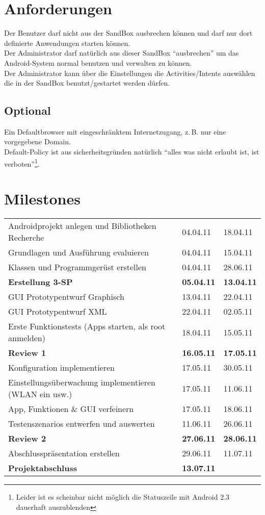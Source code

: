 \documentclass[12pt,a4paper,ngerman]{scrartcl}
\newcommand{\zB}{\mbox{z.\,B.}\xspace}
\begin{document}
\section*{Anforderungen}
Der Benutzer darf nicht aus der SandBox ausbrechen können und darf nur dort definierte Anwendungen starten können. \\
Der Administrator darf natürlich aus dieser SandBox \enquote{ausbrechen} um das Android-System normal benutzen und verwalten zu können. \\
Der Administrator kann über die Einstellungen die Activities/Intents auswählen die in der SandBox benutzt/gestartet werden dürfen.
\subsection*{Optional}
Ein Defaultbrowser mit eingeschränktem Internetzugang, \zB nur eine vorgegebene Domain. \\
Default-Policy ist aus sicherheitsgründen natürlich \enquote{alles was nicht erlaubt ist, ist verboten}\footnote{Leider ist es scheinbar nicht möglich die Statuszeile mit Android 2.3 dauerhaft auszublenden}.

\section*{Milestones}
\begin{tabular}{ l l l }
Androidprojekt anlegen und Bibliotheken Recherche & 04.04.11 & 18.04.11 \\
Grundlagen und Ausführung evaluieren & 04.04.11 & 15.04.11 \\
Klassen und Programmgerüst erstellen & 04.04.11 & 28.06.11 \\
\textbf{Erstellung 3-SP} & \textbf{05.04.11} & \textbf{13.04.11} \\
GUI Prototypentwurf Graphisch & 13.04.11 & 22.04.11 \\
GUI Prototypentwurf XML & 22.04.11 & 02.05.11 \\
Erste Funktionstests (Apps starten, als root anmelden) & 18.04.11 & 15.05.11 \\
\textbf{Review 1} & \textbf{16.05.11} & \textbf{17.05.11} \\
Konfiguration implementieren & 17.05.11 & 30.05.11 \\
Einstellungsüberwachung implementieren (WLAN ein usw.) & 17.05.11 & 11.06.11 \\
App, Funktionen \& GUI verfeinern & 17.05.11 & 18.06.11 \\
Testenszenarios entwerfen und auswerten & 11.06.11 & 26.06.11 \\
\textbf{Review 2} & \textbf{27.06.11} & \textbf{28.06.11} \\
Abschlusspräsentation erstellen & 29.06.11 & 11.07.11 \\
\textbf{Projektabschluss} & \textbf{13.07.11} \\
\end{tabular}
\end{document}
